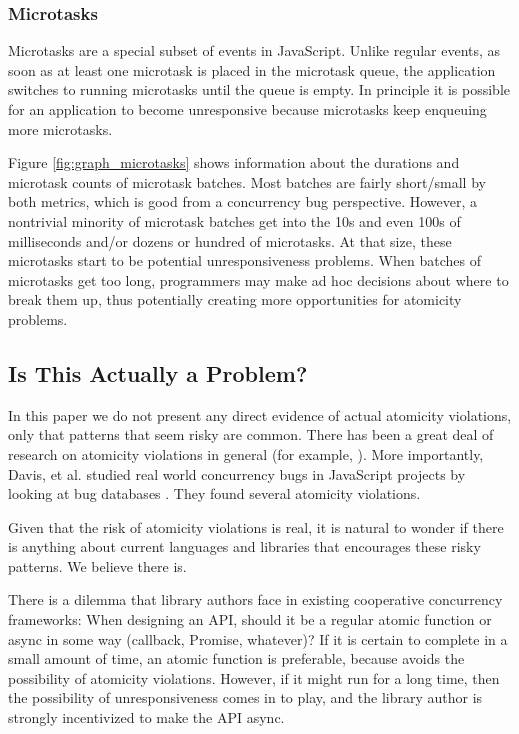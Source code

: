 \documentclass[sigplan,10pt,review,anonymous]{acmart}\settopmatter{printfolios=true,printccs=false,printacmref=false}
\begin{document}
\subsubsection{Microtasks}

Microtasks are a special subset of events in JavaScript.
Unlike regular events, as soon as at least one microtask is placed in the microtask queue, the application switches to running microtasks until the queue is empty.
In principle it is possible for an application to become unresponsive because microtasks keep enqueuing more microtasks.

Figure \ref{fig:graph_microtasks} shows information about the durations and microtask counts of microtask batches.
Most batches are fairly short/small by both metrics, which is good from a concurrency bug perspective.
However, a nontrivial minority of microtask batches get into the 10s and even 100s of milliseconds and/or dozens or hundred of microtasks.
At that size, these microtasks start to be potential unresponsiveness problems.
When batches of microtasks get too long, programmers may make ad hoc decisions about where to break them up, thus potentially creating more opportunities for atomicity problems.

\subsection{Is This Actually a Problem?}

In this paper we do not present any direct evidence of actual atomicity violations, only that patterns that seem risky are common.
There has been a great deal of research on atomicity violations in general (for example, \cite{Lu2008}).
More importantly, Davis, et al. studied real world concurrency bugs in JavaScript projects by looking at bug databases \cite{Davis2017}.
They found several atomicity violations.

Given that the risk of atomicity violations is real, it is natural to wonder if there is anything about current languages and libraries that encourages these risky patterns.
We believe there is.

There is a dilemma that library authors face in existing cooperative concurrency frameworks:
When designing an API, should it be a regular atomic function or async in some way (callback, Promise, whatever)?
If it is certain to complete in a small amount of time, an atomic function is preferable, because avoids the possibility of atomicity violations.
However, if it might run for a long time, then the possibility of unresponsiveness comes in to play, and the library author is strongly incentivized to make the API async.
\end{document}
